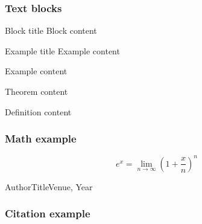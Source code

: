 \documentclass[aspectratio=169]{beamer}
\begin{document}
\begin{frame}
  \frametitle{Text blocks}
  
  \begin{block}{Block title}
    Block content
  \end{block}

  \begin{exampleblock}{Example title}
    Example content
  \end{exampleblock}

  \begin{example}
    Example content
  \end{example}

  \begin{theorem}
    Theorem content
  \end{theorem}

  \begin{definition}
    Definition content
  \end{definition}
\end{frame}

\begin{frame}
  \frametitle{Math example}
  \begin{equation}
    e^x = \lim_{n \to \infty}\left(1 + \frac{x}{n}\right)^n
  \end{equation}
\end{frame}

\begin{citeframe}{Author}{Title}{Venue, Year}
  \frametitle{Citation example}
\end{citeframe}
\end{document}
